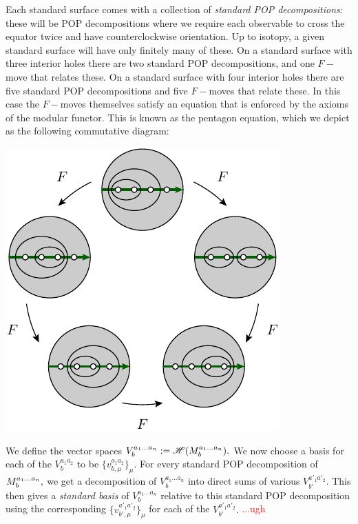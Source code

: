 \documentclass[aps, prl, letterpaper, twocolumn, superscriptaddress, notitlepage, 10pt]{revtex4-1}
\newcommand{\simon}[1]{\textcolor{red}{#1}}
\newcommand{\F}{\mathscr{H}} %
\begin{document}
Each standard surface comes with a collection of
\emph{standard POP decompositions}:
these will be POP decompositions where we require each
observable to cross the
equator twice and have counterclockwise orientation.
Up to isotopy, a given standard surface will have only finitely many of these.
On a standard surface with three
interior holes there are two standard POP decompositions,
and one $F-$move that relates these.
On a standard surface with four interior holes there are five 
standard POP decompositions and five $F-$moves that relate these.
In this case the $F-$moves themselves satisfy an equation
that is enforced by the axioms of the modular functor.
This is known as the pentagon equation, which we depict as
the following commutative diagram:
\begin{center}
\includegraphics[]{pic-pentagon.pdf}
\end{center}

We define the vector spaces 
$ V^{a_1...a_n}_{b} := \F(\StdM).$ 
We now choose a basis for each of the
$V^{a_1a_2}_{b}$ to be $\{v^{a_1a_2}_{b,\mu}\}_{\mu}.$
For every standard POP decomposition of $M^{a_1...a_n}_{b},$
we get a decomposition of 
$V^{a_1...a_n}_{b}$ into direct sums of various %
$V^{a'_1a'_2}_{b'}.$ 
This then gives a \emph{standard basis} of $V^{a_1...a_n}_{b}$
relative to this standard POP decomposition
using the corresponding  $\{v^{a'_1a'_2}_{b',\mu}\}_{\mu}$
for each of the $V^{a'_1a'_2}_{b'}.$ %
\simon{...ugh}
\end{document}
